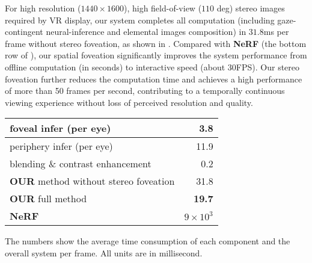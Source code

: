 For high resolution ($1440\times1600$), high field-of-view ($110$ deg) stereo images required by VR display, our system completes all computation (including gaze-contingent neural-inference and elemental images composition) in $31.8$ms per frame without stereo foveation, as shown in  . Compared with {\bf NeRF} (the bottom row of ), our spatial foveation significantly improves the system performance from offline computation (in seconds) to interactive speed (about 30FPS).
Our stereo foveation further reduces the computation time and achieves a high performance of more than 50 frames per second, contributing to a temporally continuous viewing experience without loss of perceived resolution and quality.

\begin{table}[thb]
    \centering
    \begin{tabular}{ l|r } 
        \toprule
         foveal infer (per eye)  & 3.8 \\
         \midrule
         periphery infer (per eye) & 11.9 \\
          \midrule
         blending \& contrast enhancement & 0.2 \\
          \midrule\midrule
         {\bf OUR} method without stereo foveation & 31.8\\
         {\bf OUR} full method & {\bf 19.7}\\
         \midrule
         {\bf NeRF} \cite{mildenhall2020nerf} & $9\times10^3$ \\
         \bottomrule
    \end{tabular}
    {%
    The numbers show the average time consumption of each component and the overall system per frame. All units are in millisecond.
    }
    \label{tbl:ablation}
\end{table}


